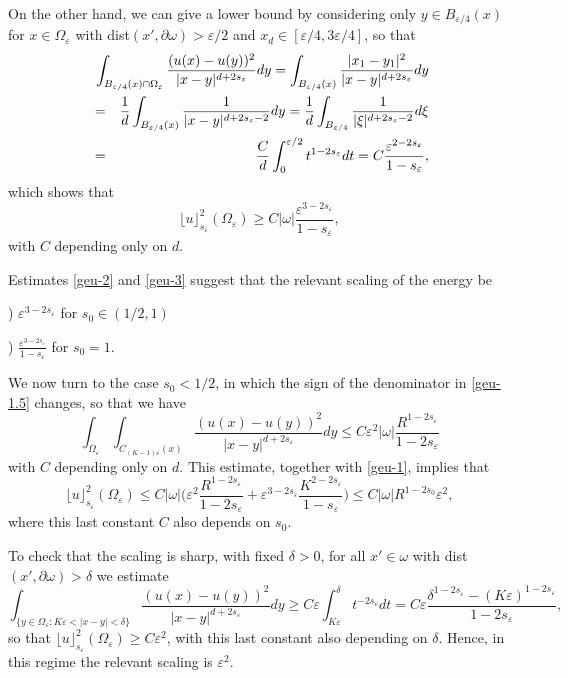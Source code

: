 \documentclass[11pt]{article}
\def\e{\varepsilon}
\begin{document}
On the other hand, we can give a lower bound by considering  only $y\in B_{\e/4}(x)$  for $x\in 
\Omega_\e$ with dist$(x',\partial\omega)>\e/2$ and $ x_d\in[\e/4,3\e/4]$, so that 
\begin{eqnarray*}
&&\hskip-1cm\int_{B_{\e/4}(x)\cap \Omega_\e}\frac{(u(x)-u(y))^2}{|x-y|^{d+2s_\e}}dy
= \int_{B_{\e/4}(x)}\frac{|x_1-y_1|^2}{|x-y|^{d+2s_\e}}dy\\
&=& \frac1d\int_{B_{\e/4}(x)}\frac{1}{|x-y|^{d+2s_\e-2}}dy
=\frac1d\int_{B_{\e/4}}\frac{1}{|\xi|^{d+2s_\e-2}}d\xi
\\
&=&\frac{C}d\int_0^{\e/2}t^{1-2s_\e}dt= C\frac{\e^{2-2s_\e}}{1-s_\e},
\end{eqnarray*}
which shows that
\begin{equation}\label{geu-3}
\lfloor u\rfloor_{s_\e}^2(\Omega_\e)\ge C|\omega|\frac{\e^{3-2s_\e}}{1-s_\e},
\end{equation}
with $C$ depending only on $d$. 

\smallskip
Estimates \eqref{geu-2} and \eqref{geu-3} suggest that the relevant scaling of the energy be 

) $\e^{3-2s_\e}$ for $s_0\in (1/2,1)$

) $\frac{\e^{3-2s_\e}}{1-s_\e}$
for $s_0=1$.

\medskip
{}
We now turn to the case $s_0<1/2$,
in which the sign of the denominator in \eqref{geu-1.5} changes, so that we have 
\begin{equation}
\int_{\Omega_\e}\int_{ C_{(K-1)\e}(x)}\frac{(u(x)-u(y))^2}{|x-y|^{d+2s_\e}}dy
\le C
\e^2|\omega|\frac{R^{1-2s_\e}}{1-2s_\e}
\end{equation}
with $C$ depending only on $d$. This estimate, together with \eqref{geu-1}, implies that 
$$
\lfloor u\rfloor_{s_\e}^2(\Omega_\e)\le C|\omega|
\Big(
\e^2\frac{R^{1-2s_\e}}{1-2s_\e}+\e^{3-2s_\e}
\frac{K^{2-2s_\e}}{1-s_\e}\Big)
\le C|\omega|R^{1-2s_0}\e^2,
$$
where this last constant $C$ also depends on $s_0$.

To check that the scaling is sharp, with fixed $\delta>0$, for all $x'\in\omega$ with dist$(x',\partial\omega)>\delta$ we estimate
$$
\int_{\{y\in\Omega_\e:K\e<|x-y|<\delta\}}\frac{(u(x)-u(y))^2}{|x-y|^{d+2s_\e}}dy\ge C\e \int_{K\e}^\delta 
t^{-2s_\e}dt=C\e\frac{\delta^{1-2s_\e}-(K\e)^{1-2s_\e}}{1-2s_\e},
$$
so that $\lfloor u\rfloor_{s_\e}^2(\Omega_\e)
\ge C\e^2$,
with this last constant also depending on $\delta$. Hence, in this regime the relevant scaling is $\e^2$.
\end{document}
